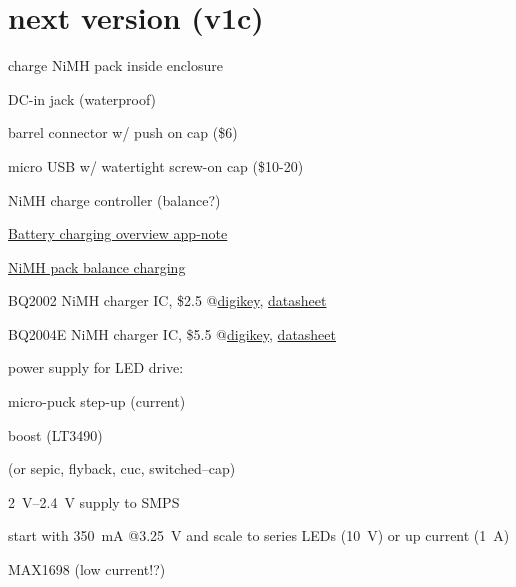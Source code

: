 \documentclass[12pt]{article} %
\begin{document}
\section{next version (v1c)}
\begin{compactitem}
	\item charge NiMH pack inside enclosure
	\begin{compactitem}
		\item DC-in jack (waterproof)
		\begin{compactitem}
			\item barrel connector w/ push on cap (\$6)
			\item micro USB w/ watertight screw-on cap (\$10-20)
		\end{compactitem}
		\item NiMH charge controller (balance?)
		\begin{compactitem}
			\item \href{http://www.analog.com/static/imported-files/tutorials/ptmsect5.pdf}{Battery charging overview app-note}
			\item \href{http://www.radicalrc.com/balancecharging.htm}{NiMH pack balance charging}
			\item BQ2002 NiMH charger IC, 
				\$2.5 @\href{http://www.digikey.com/product-detail/en/BQ2002PN/296-9326-5-ND/379871}{digikey},
				\href{http://www.ti.com/lit/ds/symlink/bq2002f.pdf}{datasheet}
			\item BQ2004E NiMH charger IC,
				\$5.5 @\href{http://www.digikey.com/product-detail/en/BQ2004EPN/296-9332-5-ND/379895}{digikey},
				\href{http://www.ti.com/lit/ds/symlink/bq2004e.pdf}{datasheet}
		\end{compactitem}
	\end{compactitem}
	\item power supply for LED drive:
	\begin{compactitem}
		\item micro-puck step-up (current)
		\item boost (LT3490)
		\item (or sepic, flyback, cuc, switched--cap) 
		\item \SIrange{2}{2.4}{\volt} supply to SMPS
		\item start with \SI{350}{\milli\ampere} @\SI{3.25}{\volt} 
			and scale to series LEDs (\SI{10}{\volt}) 
			or up current (\SI{1}{\ampere})
		\item MAX1698 (low current!?)
	\end{compactitem}
\end{compactitem}
\end{document}
